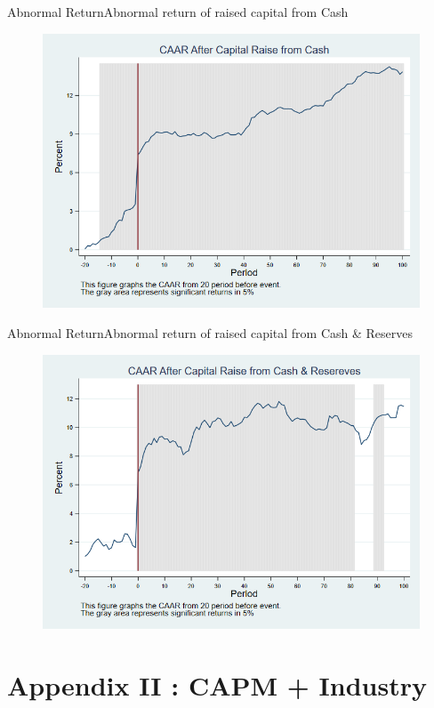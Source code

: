 \documentclass{beamer}
\begin{document}
\begin{frame}{Abnormal Return}{Abnormal return of raised capital from Cash}
	\label{abreturncashWithoutAlpha}
	\begin{figure}
		\centering
		\includegraphics[width=0.65\linewidth]{AbReturnCash_WithoutAlpha}
		\label{fig:abreturncash3}
	\end{figure}
	\hfill\hyperlink{abreturncash}{}
\end{frame}


\begin{frame}{Abnormal Return}{Abnormal return of raised capital from Cash \& Reserves}
	\label{abreturnhybridWithoutAlpha}
	\begin{figure}
		\centering
		\includegraphics[width=0.65\linewidth]{AbReturnHybrid_WithoutAlpha}
		\label{fig:abreturnhybrid3}
	\end{figure}
	\hfill\hyperlink{abreturnhybrid}{}
\end{frame}




\section{Appendix II : CAPM + Industry}
\end{document}
